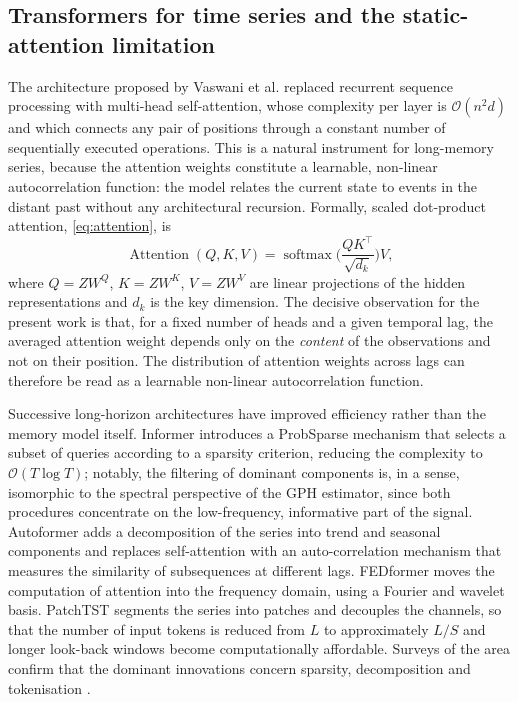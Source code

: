 \documentclass[journal]{IEEEtran}
\begin{document}
\subsection{Transformers for time series and the static-attention limitation}

The architecture proposed by Vaswani et al. \cite{vaswani2017attention} replaced recurrent
sequence processing with multi-head self-attention, whose complexity per layer is
$\mathcal{O}(n^2d)$ and which connects any pair of positions through a constant number of
sequentially executed operations. This is a natural instrument for long-memory series, because the
attention weights constitute a learnable, non-linear autocorrelation function: the model relates
the current state to events in the distant past without any architectural recursion. Formally,
scaled dot-product attention, \eqref{eq:attention}, is
\begin{equation}\label{eq:attention}
\operatorname{Attention}(Q,K,V)=\operatorname{softmax}\!\Big(\frac{QK^{\top}}{\sqrt{d_k}}\Big)V,
\end{equation}
where $Q=ZW^Q$, $K=ZW^K$, $V=ZW^V$ are linear projections of the hidden representations and $d_k$
is the key dimension. The decisive observation for the present work is that, for a fixed number of
heads and a given temporal lag, the averaged attention weight depends only on the \emph{content} of
the observations and not on their position. The distribution of attention weights across lags can
therefore be read as a learnable non-linear autocorrelation function.

Successive long-horizon architectures have improved efficiency rather than the memory model
itself. Informer \cite{zhou2021informer} introduces a ProbSparse mechanism that selects a subset
of queries according to a sparsity criterion, reducing the complexity to $\mathcal{O}(T\log T)$;
notably, the filtering of dominant components is, in a sense, isomorphic to the spectral
perspective of the GPH estimator, since both procedures concentrate on the low-frequency,
informative part of the signal. Autoformer \cite{wu2021autoformer} adds a decomposition of the
series into trend and seasonal components and replaces self-attention with an auto-correlation
mechanism that measures the similarity of subsequences at different lags. FEDformer
\cite{zhou2022fedformer} moves the computation of attention into the frequency domain, using a
Fourier and wavelet basis. PatchTST \cite{nie2023time} segments the series into patches and
decouples the channels, so that the number of input tokens is reduced from $L$ to approximately
$L/S$ and longer look-back windows become computationally affordable. Surveys of the area confirm
that the dominant innovations concern sparsity, decomposition and tokenisation
\cite{wen2023transformers,tay2022efficient}.
\end{document}
